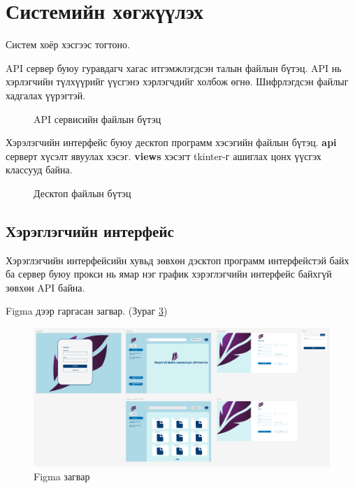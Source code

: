 \section{Системийн хөгжүүлэх}
Систем хоёр хэсгээс тогтоно.

API сервер буюу гуравдагч хагас итгэмжлэгдсэн талын файлын бүтэц. API нь хэрлэгчийн түлхүүрийг үүсгэнэ хэрлэгчдийг холбож өгнө. Шифрлэгдсэн файлыг хадгалах үүрэгтэй.
\begin{figure}[H]
    \label{fig:service_structure}
    \caption{API сервисийн файлын бүтэц}
\end{figure}

Хэрэлэгчийн интерфейс буюу десктоп программ хэсэгийн файлын бүтэц. \textbf{api} серверт хүсэлт явуулах хэсэг. \textbf{views} хэсэгт tkinter-г ашиглах цонх үүсгэх классууд байна.

\begin{figure}[H]
    \label{fig:desktop_structure}
    \caption{Десктоп файлын бүтэц}
\end{figure}

\subsection*{Хэрэглэгчийн интерфейс}
Хэрэглэгчийн интерфейсийн хувьд зөвхөн дэсктоп программ интерфейстэй байх ба сервер буюу прокси нь ямар нэг график хэрэглэгчийн интерфейс байхгүй зөвхөн API байна. 

Figma дээр гаргасан загвар. (Зураг \ref*{fig:figma})
\begin{figure}[H]
    \centering
    \includegraphics[scale=0.3]{Figures/ui/figma.png}
    \caption{Figma загвар}
    \label{fig:figma}
\end{figure}

